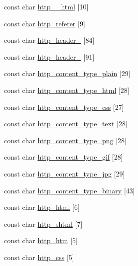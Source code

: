 \begin{DoxyCompactItemize}
const char \hyperlink{http-strings_8c_ae31e183cd9f67c1ec51663c38180b8ee}{http\_\_\-html} \mbox{[}10\mbox{]}
\item 
const char \hyperlink{http-strings_8c_a52402a0f5f1a643cf91cec0333241654}{http\_\-referer} \mbox{[}9\mbox{]}
\item 
const char \hyperlink{http-strings_8c_af0c31564afc8cb5ffe3006045593564a}{http\_\-header\_} \mbox{[}84\mbox{]}
\item 
const char \hyperlink{http-strings_8c_ae076ba5c11f61efb98c599b3252ea8e7}{http\_\-header\_} \mbox{[}91\mbox{]}
\item 
const char \hyperlink{http-strings_8c_a93ca46951cc4842f1abde782f3d2358d}{http\_\-content\_\-type\_\-plain} \mbox{[}29\mbox{]}
\item 
const char \hyperlink{http-strings_8c_a9067d0f43f75f731ec8b6cf5bc937b46}{http\_\-content\_\-type\_\-html} \mbox{[}28\mbox{]}
\item 
const char \hyperlink{http-strings_8c_a5475ca39ad42a7477a35e10e34697775}{http\_\-content\_\-type\_\-css} \mbox{[}27\mbox{]}
\item 
const char \hyperlink{http-strings_8c_aed57746b7fb18ac9361cfa7dc05c9782}{http\_\-content\_\-type\_\-text} \mbox{[}28\mbox{]}
\item 
const char \hyperlink{http-strings_8c_a371c581997fc6a5803c3551e33be77db}{http\_\-content\_\-type\_\-png} \mbox{[}28\mbox{]}
\item 
const char \hyperlink{http-strings_8c_aef053704ad19e807a1f0f19cb060f3c6}{http\_\-content\_\-type\_\-gif} \mbox{[}28\mbox{]}
\item 
const char \hyperlink{http-strings_8c_a34bd96a209a37f4b16744500510c50a0}{http\_\-content\_\-type\_\-jpg} \mbox{[}29\mbox{]}
\item 
const char \hyperlink{http-strings_8c_a2ce17b5a8d67c7d96121463bf239ea68}{http\_\-content\_\-type\_\-binary} \mbox{[}43\mbox{]}
\item 
const char \hyperlink{http-strings_8c_ac61a385f177ab70118739cc3e38c11af}{http\_\-html} \mbox{[}6\mbox{]}
\item 
const char \hyperlink{http-strings_8c_a52dc3e4726e77d123639f5a2ef5d82d8}{http\_\-shtml} \mbox{[}7\mbox{]}
\item 
const char \hyperlink{http-strings_8c_a26642210d36f0e7f65fb3a98402e8f88}{http\_\-htm} \mbox{[}5\mbox{]}
\item 
const char \hyperlink{http-strings_8c_ac0d021741ad67c52f199e8a22037ac8e}{http\_\-css} \mbox{[}5\mbox{]}
\item 

\end{DoxyCompactItemize}
